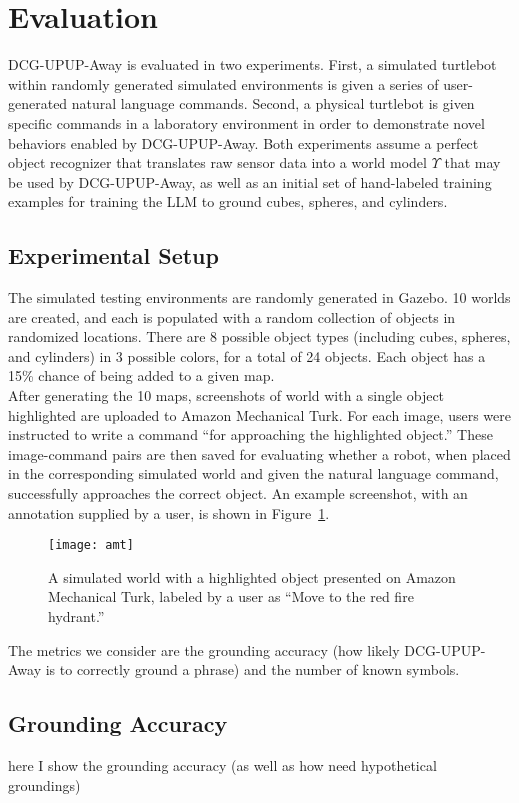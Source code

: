 \section{Evaluation}
\label{sec:evaluation}
DCG-UPUP-Away is evaluated in two experiments.
First, a simulated turtlebot within randomly generated simulated environments is given a series of user-generated natural language commands.
Second, a physical turtlebot is given specific commands in a laboratory environment in order to demonstrate novel behaviors enabled by DCG-UPUP-Away.
Both experiments assume a perfect object recognizer that translates raw sensor data into a world model $\Upsilon$ that may be used by DCG-UPUP-Away, as well as an initial set of hand-labeled training examples for training the LLM to ground cubes, spheres, and cylinders.\\
\subsection{Experimental Setup}
\indent The simulated testing environments are randomly generated in Gazebo.
10 worlds are created, and each is populated with a random collection of objects in randomized locations.
There are 8 possible object types (including cubes, spheres, and cylinders) in 3 possible colors, for a total of 24 objects.
Each object has a 15\% chance of being added to a given map.\\
\indent After generating the 10 maps, screenshots of world with a single object highlighted are uploaded to Amazon Mechanical Turk.
For each image, users were instructed to write a command ``for approaching the highlighted object.''
These image-command pairs are then saved for evaluating whether a robot, when placed in the corresponding simulated world and given the natural language command, successfully approaches the correct object.
An example screenshot, with an annotation supplied by a user, is shown in Figure~\ref{fig:amt}.\\
\begin{figure}[h]
	\centering
    \texttt{[image: amt]}
	\caption{A simulated world with a highlighted object presented on Amazon Mechanical Turk, labeled by a user as ``Move to the red fire hydrant.''}
	\label{fig:amt}
\end{figure}
The metrics we consider are the grounding accuracy (how likely DCG-UPUP-Away is to correctly ground a phrase) and the number of known symbols.

\subsection{Grounding Accuracy}
here I show the grounding accuracy (as well as how need hypothetical groundings)

